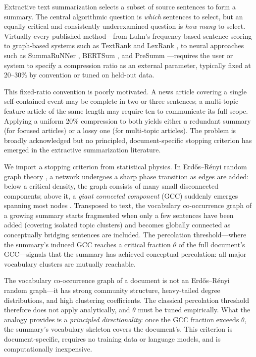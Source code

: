 \documentclass[11pt,letterpaper]{article}
\begin{document}
Extractive text summarization selects a subset of source sentences to form a summary.
The central algorithmic question is \emph{which} sentences to select, but an equally
critical and consistently underexamined question is \emph{how many} to select. Virtually
every published method---from Luhn's frequency-based sentence scoring
\citep{Luhn1958} to graph-based systems such as TextRank \citep{Mihalcea2004} and
LexRank \citep{Erkan2004}, to neural approaches such as SummaRuNNer
\citep{Nallapati2017}, BERTSum \citep{Liu2019bert}, and PreSumm
\citep{Liu2019presumm}---requires the user or system to specify a compression ratio as
an external parameter, typically fixed at 20--30\% by convention or tuned on held-out
data.

This fixed-ratio convention is poorly motivated. A news article covering a single
self-contained event may be complete in two or three sentences; a multi-topic feature
article of the same length may require ten to communicate its full scope. Applying a
uniform 20\% compression to both yields either a redundant summary (for focused articles)
or a lossy one (for multi-topic articles). The problem is broadly acknowledged
\citep{Mihalcea2004,Erkan2004} but no principled, document-specific stopping criterion
has emerged in the extractive summarization literature.

We import a stopping criterion from statistical physics. In Erd{\H o}s--R\'enyi random
graph theory \citep{ErdosRenyi1960}, a network undergoes a sharp phase transition as
edges are added: below a critical density, the graph consists of many small disconnected
components; above it, a \emph{giant connected component} (GCC) suddenly emerges spanning
most nodes \citep{Bollobas2001}. Transposed to text, the vocabulary co-occurrence graph
of a growing summary starts fragmented when only a few sentences have been added
(covering isolated topic clusters) and becomes globally connected as conceptually
bridging sentences are included. The percolation threshold---where the summary's induced
GCC reaches a critical fraction $\theta$ of the full document's GCC---signals that the
summary has achieved conceptual percolation: all major vocabulary clusters are mutually
reachable.

The vocabulary co-occurrence graph of a document is not an Erd{\H o}s--R\'enyi random
graph---it has strong community structure, heavy-tailed degree distributions, and high
clustering coefficients. The classical percolation threshold therefore does not apply
analytically, and $\theta$ must be tuned empirically. What the analogy provides is a
\emph{principled directionality}: once the GCC fraction exceeds $\theta$, the summary's
vocabulary skeleton covers the document's. This criterion is document-specific, requires
no training data or language models, and is computationally inexpensive.
\end{document}
